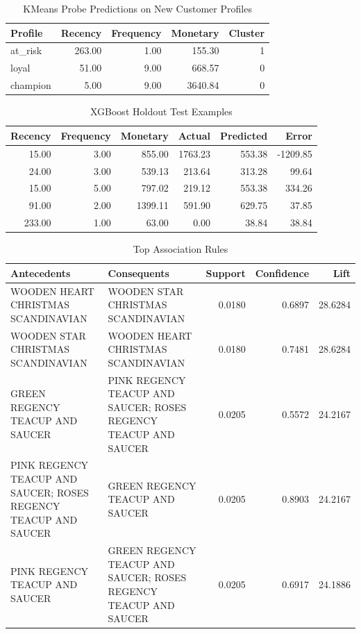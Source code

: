 \begin{table}[H]
\centering
\caption{KMeans Probe Predictions on New Customer Profiles}
\smallskip
\begin{tabular}{lrrrr}
\toprule
\textbf{Profile} & \textbf{Recency} & \textbf{Frequency} & \textbf{Monetary} & \textbf{Cluster} \\
\midrule
at\_risk & 263.00 & 1.00 & 155.30 & 1 \\
loyal & 51.00 & 9.00 & 668.57 & 0 \\
champion & 5.00 & 9.00 & 3640.84 & 0 \\
\bottomrule
\end{tabular}
\end{table}


\begin{table}[H]
\centering
\caption{XGBoost Holdout Test Examples}
\smallskip
\begin{tabular}{rrrrrr}
\toprule
\textbf{Recency} & \textbf{Frequency} & \textbf{Monetary} & \textbf{Actual} & \textbf{Predicted} & \textbf{Error} \\
\midrule
15.00 & 3.00 & 855.00 & 1763.23 & 553.38 & -1209.85 \\
24.00 & 3.00 & 539.13 & 213.64 & 313.28 & 99.64 \\
15.00 & 5.00 & 797.02 & 219.12 & 553.38 & 334.26 \\
91.00 & 2.00 & 1399.11 & 591.90 & 629.75 & 37.85 \\
233.00 & 1.00 & 63.00 & 0.00 & 38.84 & 38.84 \\
\bottomrule
\end{tabular}
\end{table}


\begin{table}[H]
\centering
\caption{Top Association Rules}
\smallskip
\footnotesize
\begin{tabular}{>{\raggedright\arraybackslash}p{4.2cm}>{\raggedright\arraybackslash}p{4.2cm}rrr}
\toprule
\textbf{Antecedents} & \textbf{Consequents} & \textbf{Support} & \textbf{Confidence} & \textbf{Lift} \\
\midrule
WOODEN HEART CHRISTMAS SCANDINAVIAN & WOODEN STAR CHRISTMAS SCANDINAVIAN & 0.0180 & 0.6897 & 28.6284 \\
WOODEN STAR CHRISTMAS SCANDINAVIAN & WOODEN HEART CHRISTMAS SCANDINAVIAN & 0.0180 & 0.7481 & 28.6284 \\
GREEN REGENCY TEACUP AND SAUCER & PINK REGENCY TEACUP AND SAUCER; ROSES REGENCY TEACUP AND SAUCER  & 0.0205 & 0.5572 & 24.2167 \\
PINK REGENCY TEACUP AND SAUCER; ROSES REGENCY TEACUP AND SAUCER  & GREEN REGENCY TEACUP AND SAUCER & 0.0205 & 0.8903 & 24.2167 \\
PINK REGENCY TEACUP AND SAUCER & GREEN REGENCY TEACUP AND SAUCER; ROSES REGENCY TEACUP AND SAUCER  & 0.0205 & 0.6917 & 24.1886 \\
\bottomrule
\end{tabular}
\end{table}


